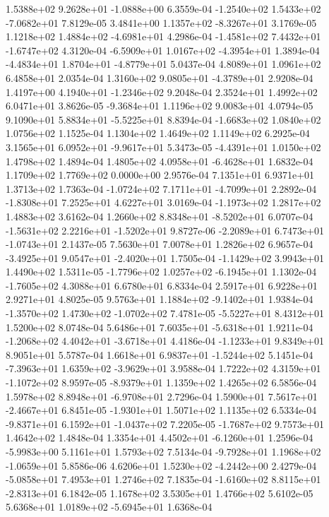  1.5388e+02  9.2628e+01 -1.0888e+00  6.3559e-04
-1.2540e+02  1.5433e+02 -7.0682e+01  7.8129e-05
 3.4841e+00  1.1357e+02 -8.3267e+01  3.1769e-05
 1.1218e+02  1.4884e+02 -4.6981e+01  4.2986e-04
-1.4581e+02  7.4432e+01 -1.6747e+02  4.3120e-04
-6.5909e+01  1.0167e+02 -4.3954e+01  1.3894e-04
-4.4834e+01  1.8704e+01 -4.8779e+01  5.0437e-04
4.8089e+01 1.0961e+02 6.4858e+01  2.0354e-04
 1.3160e+02  9.0805e+01 -4.3789e+01  2.9208e-04
 1.4197e+00  4.1940e+01 -1.2346e+02  9.2048e-04
2.3524e+01 1.4992e+02 6.0471e+01  3.8626e-05
-9.3684e+01  1.1196e+02  9.0083e+01  4.0794e-05
 9.1090e+01  5.8834e+01 -5.5225e+01  8.8394e-04
-1.6683e+02  1.0840e+02  1.0756e+02  1.1525e-04
1.1304e+02 1.4649e+02 1.1149e+02  6.2925e-04
 3.1565e+01  6.0952e+01 -9.9617e+01  5.3473e-05
-4.4391e+01  1.0150e+02  1.4798e+02  1.4894e-04
 1.4805e+02  4.0958e+01 -6.4628e+01  1.6832e-04
1.1709e+02 1.7769e+02 0.0000e+00  2.9576e-04
7.1351e+01 6.9371e+01 1.3713e+02  1.7363e-04
-1.0724e+02  7.1711e+01 -4.7099e+01  2.2892e-04
-1.8308e+01  7.2525e+01  4.6227e+01  3.0169e-04
-1.1973e+02  1.2817e+02  1.4883e+02  3.6162e-04
 1.2660e+02  8.8348e+01 -8.5202e+01  6.0707e-04
-1.5631e+02  2.2216e+01 -1.5202e+01  9.8727e-06
-2.2089e+01  6.7473e+01 -1.0743e+01  2.1437e-05
7.5630e+01 7.0078e+01 1.2826e+02  6.9657e-04
-3.4925e+01  9.0547e+01 -2.4020e+01  1.7505e-04
-1.1429e+02  3.9943e+01  1.4490e+02  1.5311e-05
-1.7796e+02  1.0257e+02 -6.1945e+01  1.1302e-04
-1.7605e+02  4.3088e+01  6.6780e+01  6.8334e-04
2.5917e+01 6.9228e+01 2.9271e+01  4.8025e-05
 9.5763e+01  1.1884e+02 -9.1402e+01  1.9384e-04
-1.3570e+02  1.4730e+02 -1.0702e+02  7.4781e-05
-5.5227e+01  8.4312e+01  1.5200e+02  8.0748e-04
 5.6486e+01  7.6035e+01 -5.6318e+01  1.9211e-04
-1.2068e+02  4.4042e+01 -3.6718e+01  4.4186e-04
-1.1233e+01  9.8349e+01  8.9051e+01  5.5787e-04
 1.6618e+01  6.9837e+01 -1.5244e+02  5.1451e-04
-7.3963e+01  1.6359e+02 -3.9629e+01  3.9588e-04
 1.7222e+02  4.3159e+01 -1.1072e+02  8.9597e-05
-8.9379e+01  1.1359e+02  1.4265e+02  6.5856e-04
 1.5978e+02  8.8948e+01 -6.9708e+01  2.7296e-04
 1.5900e+01  7.5617e+01 -2.4667e+01  6.8451e-05
-1.9301e+01  1.5071e+02  1.1135e+02  6.5334e-04
-9.8371e+01  6.1592e+01 -1.0437e+02  7.2205e-05
-1.7687e+02  9.7573e+01  1.4642e+02  1.4848e-04
 1.3354e+01  4.4502e+01 -6.1260e+01  1.2596e-04
-5.9983e+00  5.1161e+01  1.5793e+02  7.5134e-04
-9.7928e+01  1.1968e+02 -1.0659e+01  5.8586e-06
 4.6206e+01  1.5230e+02 -4.2442e+00  2.4279e-04
-5.0858e+01  7.4953e+01  1.2746e+02  7.1835e-04
-1.6160e+02  8.8115e+01 -2.8313e+01  6.1842e-05
1.1678e+02 3.5305e+01 1.4766e+02  5.6102e-05
 5.6368e+01  1.0189e+02 -5.6945e+01  1.6368e-04
